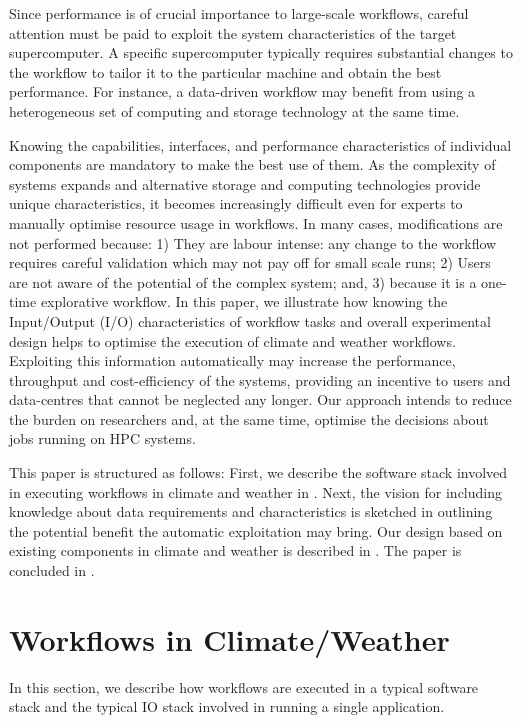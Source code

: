\documentclass{superfri}
\begin{document}
Since performance is of crucial importance to large-scale workflows, careful attention must be paid to exploit the system characteristics of the target supercomputer.
A specific supercomputer typically requires substantial changes to the workflow to tailor it to the particular machine and obtain the best performance.
For instance, a data-driven workflow may benefit from using a heterogeneous set of computing and storage technology at the same time.

Knowing the capabilities, interfaces, and performance characteristics of individual components are mandatory to make the best use of them.
As the complexity of systems expands and alternative storage and computing technologies provide unique characteristics, it becomes increasingly difficult even for experts to manually optimise resource usage in workflows.
In many cases, modifications are not performed because: 1) They are labour intense: any change to the workflow requires careful validation which may not pay off for small scale runs; 2) Users are not aware of the potential of the complex system; and, 3) because it is a one-time explorative workflow.
In this paper, we illustrate how knowing the Input/Output (I/O) characteristics of workflow tasks and overall experimental design helps to optimise the execution of climate and weather workflows.
Exploiting this information automatically may increase the performance, throughput and cost-efficiency of the systems, providing an incentive to users and data-centres that cannot be neglected any longer.
Our approach intends to reduce the burden on researchers and, at the same time, optimise the decisions about jobs running on HPC systems.

This paper is structured as follows:
First, we describe the software stack involved in executing workflows in climate and weather in .
Next, the vision for including knowledge about data requirements and characteristics is sketched in   outlining the potential benefit the automatic exploitation may bring.
Our design based on existing components in climate and weather is described in .
The paper is concluded in .


\section{Workflows in Climate/Weather}
\label{sec:workflows}

In this section, we describe how workflows are executed in a typical software stack and the typical IO stack involved in running a single application.
\end{document}
